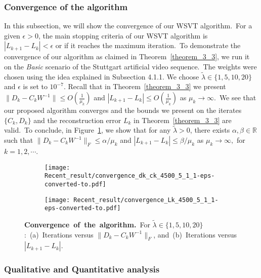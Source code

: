 \documentclass[twoside,11pt]{article}
\begin{document}
\subsubsection{Convergence of the algorithm}
In this subsection, we will show the convergence of our WSVT algorithm.~For a given $\epsilon>0$, the main stopping criteria of our WSVT algorithm is $|L_{k+1}-L_k|<\epsilon$ or if it reaches the maximum iteration.~To demonstrate the convergence of our algorithm as claimed in Theorem~\ref{theorem_3_3}, we run it on the {\it Basic} scenario of the Stuttgart artificial video sequence.~The weights were chosen using the idea explained in Subsection 4.1.1. We choose $\displaystyle{\tilde{\lambda}\in\{1,5,10,20\}}$ and $\epsilon$ is set to $10^{-7}$. Recall that in Theorem~\ref{theorem_3_3} we present $\|D_k-C_kW^{-1}\|\le O(\frac{1}{\mu_k})$ and $|L_{k+1}-L_k|\le O(\frac{1}{\mu_k})$ as $\mu_k\to\infty$.~We see that our proposed algorithm converges and the bounds we present on the iterates $\{C_k,D_k\}$ and the reconstruction error $L_k$ in Theorem~\ref{theorem_3_3} are valid.~To conclude, in Figure~\ref{conv}, we show that for any $\tilde{\lambda}>0$, there exists $\alpha,\beta\in\mathbb{R}$ such that $\|D_k-C_kW^{-1}\|_F\le\alpha/\mu_k$ and $|L_{k+1}-L_k|\le\beta/\mu_k$ as $\mu_k\to\infty,$ for $k=1,2,\cdots$.
 \begin{figure}
 	\centering
 	\begin{subfigure}{0.5\textwidth}
 		\texttt{[image: Recent\_result/convergence\_dk\_ck\_4500\_5\_1\_1-eps-converted-to.pdf]}
 		\caption{}
 	\end{subfigure}\hspace{-1ex}
 	\begin{subfigure}{0.5\textwidth}
 		\texttt{[image: Recent\_result/convergence\_Lk\_4500\_5\_1\_1-eps-converted-to.pdf]}
 		\caption{}
 	\end{subfigure}
 	\caption{{\bf Convergence~of~the~algorithm.}~For $\displaystyle{\tilde{\lambda}\in\{1,5,10,20\}}$:~(a)~Iterations versus $\|D_k-C_kW^{-1}\|_F$, and~(b)~Iterations versus $|L_{k+1}-L_k|$.}\label{conv}
 \end{figure}

\subsubsection{Qualitative and Quantitative analysis}
\end{document}
